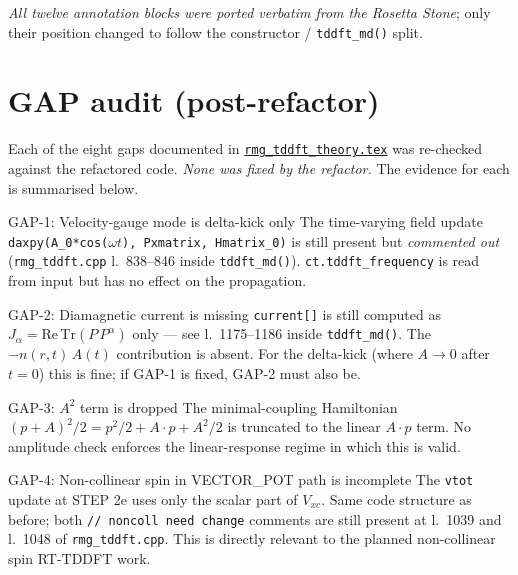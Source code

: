 \documentclass[11pt,letterpaper]{article}
\begin{document}
\noindent\textit{All twelve annotation blocks were ported verbatim from the
Rosetta Stone}; only their position changed to follow the constructor /
\texttt{tddft\_md()} split.

\section{GAP audit (post-refactor)}
\label{sec:gaps}

Each of the eight gaps documented in
\href{rmg_tddft_theory.tex}{\texttt{rmg\_tddft\_theory.tex}} was re-checked
against the refactored code.  \emph{None was fixed by the refactor.}
The evidence for each is summarised below.

\begin{gapbox}{GAP-1: Velocity-gauge mode is delta-kick only}
The time-varying field update
\texttt{daxpy(A\_0*cos($\omega t$), Pxmatrix, Hmatrix\_0)}
is still present but \emph{commented out} (\texttt{rmg\_tddft.cpp} l.~838--846
inside \texttt{tddft\_md()}).  \texttt{ct.tddft\_frequency} is read from input
but has no effect on the propagation.
\end{gapbox}

\begin{gapbox}{GAP-2: Diamagnetic current is missing}
\texttt{current[]} is still computed as $J_\alpha = \mathrm{Re}\,
\mathrm{Tr}(P\, P^\alpha)$ only --- see l.~1175--1186 inside
\texttt{tddft\_md()}.  The $-n(r,t)\,A(t)$ contribution is absent.  For the
delta-kick (where $A \to 0$ after $t=0$) this is fine; if GAP-1 is fixed,
GAP-2 must also be.
\end{gapbox}

\begin{gapbox}{GAP-3: \texorpdfstring{$A^2$}{A^2} term is dropped}
The minimal-coupling Hamiltonian $(p + A)^2/2 = p^2/2 + A\cdot p + A^2/2$
is truncated to the linear $A\cdot p$ term.  No amplitude check enforces the
linear-response regime in which this is valid.
\end{gapbox}

\begin{gapbox}{GAP-4: Non-collinear spin in VECTOR\_POT path is incomplete}
The \texttt{vtot} update at STEP 2e uses only the scalar part of $V_{xc}$.
Same code structure as before; both \texttt{// noncoll need change} comments
are still present at l.~1039 and l.~1048 of \texttt{rmg\_tddft.cpp}.
This is directly relevant to the planned non-collinear spin RT-TDDFT work.
\end{gapbox}
\end{document}
